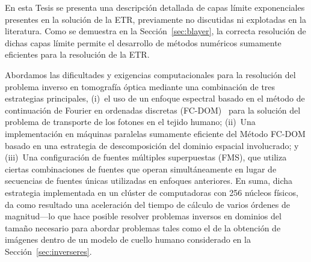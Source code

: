  En esta Tesis se presenta una descripción detallada 
de capas límite exponenciales presentes en la solución de la ETR, previamente no discutidas ni explotadas en la literatura. Como se demuestra en la Sección~\ref{sec:blayer}, la correcta resolución de dichas capas límite 
permite el desarrollo de métodos numéricos sumamente eficientes para la resolución de la ETR. 

Abordamos las dificultades y exigencias computacionales para la resolución del problema inverso en tomografía óptica 
mediante una combinación de tres estrategias principales, (i)~el uso de
un enfoque espectral basado en el método de continuación de Fourier 
en ordenadas discretas
(FC-DOM)~\cite{Gaggioli2019} para la solución del 
problema de transporte de los fotones en el tejido humano; (ii)~Una implementación 
en máquinas paralelas sumamente eficiente del
Método FC-DOM basado en una estrategia de descomposición del dominio espacial 
involucrado; y (iii)~Una configuración de fuentes múltiples superpuestas (FMS), que utiliza ciertas combinaciones de fuentes que operan simultáneamente en lugar de
secuencias de fuentes únicas utilizadas en enfoques anteriores. En suma, 
dicha estrategia 
implementada en un clúster de computadoras con 256 núcleos físicos, da como resultado una aceleración del tiempo de cálculo de varios órdenes de
magnitud---lo que hace posible resolver problemas inversos en dominios del 
tamaño necesario para abordar 
problemas tales como el de la obtención de imágenes dentro de un modelo de cuello
humano considerado en la Sección~\ref{sec:inverseres}.

